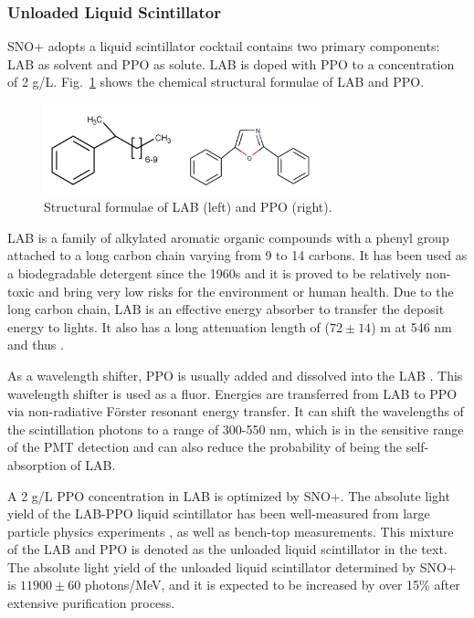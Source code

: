 \subsubsection{Unloaded Liquid Scintillator}\label{sect:LS_SNO+}
SNO+ adopts a liquid scintillator cocktail contains two primary components: LAB as solvent and PPO as solute. LAB is doped with PPO to a concentration of 2 g/L. Fig.~\ref{labppo-molecule} shows the chemical structural formulae of LAB and PPO\cite{collaboration2020development}.
\begin{figure}[!htb]
	\centering
	\includegraphics[width=8cm]{lab-ppo-molecule.png}
	\caption[Structural formulae of LAB and PPO.]{Structural formulae of LAB (left) and PPO (right).}
	\label{labppo-molecule}
\end{figure}

LAB is a family of alkylated aromatic organic compounds with a phenyl group attached to a long carbon chain varying from 9 to 14 carbons\cite{wiki_LAB, collaboration2020development}. It has been used as a biodegradable detergent since the 1960s and it is proved to be relatively non-toxic and bring very low risks for the environment or human health\cite{wiki_LAB}. Due to the long carbon chain, LAB is an effective energy absorber to transfer the deposit energy to lights. It also has a long attenuation length of ($72\pm 14$) m at 546 nm and thus \cite{snop_jinst}.

As a wavelength shifter, PPO is usually added and dissolved into the LAB \cite{wunderly1990new}. This wavelength shifter is used as a fluor. Energies are transferred from LAB to PPO via non-radiative F{\"o}rster resonant energy transfer. It can shift the wavelengths of the scintillation photons to a range of 300-550 nm, which is in the sensitive range of the PMT detection and can also reduce the probability of being the self-absorption of LAB.

A 2 g/L PPO concentration in LAB is optimized by SNO+\cite{whitepaper}. The absolute light yield of the LAB-PPO liquid scintillator has been well-measured from large particle physics experiments \cite{xing2015preliminary,agostini2018comprehensive}, as well as bench-top measurements\cite{xing2015preliminary,kaptanoglu2019cherenkov, novikov}. This mixture of the LAB and PPO is denoted as the unloaded liquid scintillator in the text. The absolute light yield of the unloaded liquid scintillator determined by SNO+ is $11900\pm 60$ photons/MeV, and it is expected to be increased by over 15\% after extensive purification process\cite{snop_jinst,grullon2014light}.

